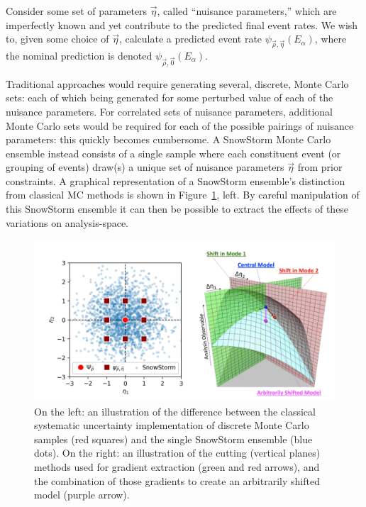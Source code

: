 \documentclass[main.tex]{subfiles}
\begin{document}
Consider some set of parameters $\vec{\eta}$, called ``nuisance parameters,'' which are imperfectly known and yet contribute to the predicted final event rates. 
We wish to, given some choice of $\vec{\eta}$, calculate a predicted event rate $\psi_{\vec{\rho}, \vec{\eta}}(E_{\alpha})$, where the nominal prediction is denoted $\psi_{\vec{\rho}, \vec{0}}(E_{\alpha})$.

Traditional approaches would require generating several, discrete, Monte Carlo sets: each of which being generated for some perturbed value of each of the nuisance parameters. 
For correlated sets of nuisance parameters, additional Monte Carlo sets would be required for each of the possible pairings of nuisance parameters: this quickly becomes cumbersome. 
A SnowStorm Monte Carlo ensemble instead consists of a single sample where each constituent event (or grouping of events) draw(s) a unique set of nuisance parameters $\vec{\eta}$ from prior constraints. 
A graphical representation of a SnowStorm ensemble's distinction from classical MC methods is shown in Figure~\ref{fig:snostorm_grad}, left.
By careful manipulation of this SnowStorm ensemble it can then be possible to extract the effects of these variations on analysis-space. 

\begin{figure}
    \centering
    \includegraphics[width=0.6\linewidth]{./figures/wacky_snowstorm.png}
    \caption{On the left: an illustration of the difference between the classical systematic uncertainty implementation of discrete Monte Carlo samples (red squares) and the single SnowStorm ensemble (blue dots). On the right: an illustration of the cutting (vertical planes) methods used for gradient extraction (green and red arrows), and the combination of those gradients to create an arbitrarily shifted model (purple arrow).}\label{fig:snostorm_grad}
\end{figure}
\end{document}
